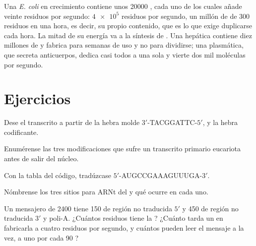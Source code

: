 \begin{example}\label{ex:b1:gene-expression:numbers}
Una \emph{E. coli} en crecimiento contiene unos \num{20000} , cada
uno de los cuales añade veinte residuos por segundo: $\num{4e5}$ residuos
por segundo, un millón de  de \qty{300}{} residuos en una hora, es
decir, su propio contenido, que es lo que exige duplicarse cada hora. La
mitad de su energía va a la síntesis de . Una  hepática
contiene diez millones de  y fabrica  para semanas de uso
y no para dividirse; una  plasmática, que secreta anticuerpos, dedica
casi todos a una sola  y vierte dos mil moléculas por segundo.
\end{example}

\section{Ejercicios}

\begin{exercise}[$\star$]\label{exo:b1:gene-expression:1}
Dese el  transcrito a partir de la hebra molde $3'$-TACGGATTC-$5'$, y la
hebra codificante.
\end{exercise}

\begin{exercise}[$\star$]\label{exo:b1:gene-expression:2}
Enumérense las tres modificaciones que sufre un transcrito primario
eucariota antes de salir del núcleo.
\end{exercise}

\begin{exercise}[$\star$]\label{exo:b1:gene-expression:3}
Con la tabla del código, tradúzcase $5'$-AUGCCGAAAGUUUGA-$3'$.
\end{exercise}

\begin{exercise}[$\star$]\label{exo:b1:gene-expression:4}
Nómbrense los tres sitios para ARNt del  y qué ocurre en cada uno.
\end{exercise}

\begin{exercise}[$\star\star$]\label{exo:b1:gene-expression:5}
Un mensajero de \qty{2400}{}  tiene \qty{150}{} de región no
traducida $5'$ y \qty{450}{} de región no traducida $3'$ y poli-A. ¿Cuántos
residuos tiene la ? ¿Cuánto tarda un  en fabricarla a cuatro
residuos por segundo, y cuántos  pueden leer el mensaje a la vez, a
uno por cada \qty{90}{} ?
\end{exercise}

